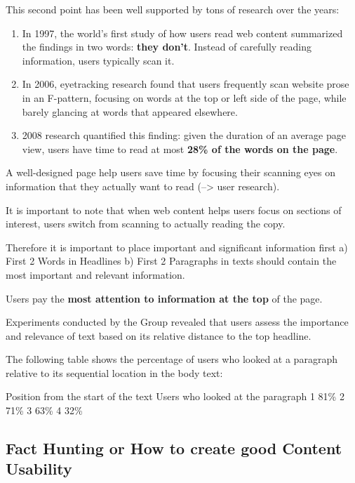 This second point has been well supported by tons of research over the years:
\begin{enumerate}
	\item In 1997, the world's first study of how users read web content summarized the findings in two words: \textbf{they don't}. Instead of carefully reading information, users typically scan it.
	\item In 2006, eyetracking research found that users frequently scan website prose in an F-pattern, focusing on words at the top or left side of the page, while barely glancing at words that appeared elsewhere.
	\item 2008 research quantified this finding: given the duration of an average page view, users have time to read at most \textbf{28\% of the words on the page}.
\end{enumerate}


A well-designed page help users save time by focusing their scanning eyes on information that they actually want to read (--> user research).

It is important to note that when web content helps users focus on sections of interest, users switch from scanning to actually reading the copy.

Therefore it is important to place important and significant information first
a) First 2 Words in Headlines
b) First 2 Paragraphs in texts should contain the most important and relevant information.

Users pay the \textbf{most attention to information at the top} of the page.

Experiments conducted by the Group revealed that users assess the importance and relevance of text based on its relative distance to the top headline. 

The following table shows the percentage of users who looked at a paragraph relative to its sequential location in the body text:

Position from the start of the text	Users who looked at the paragraph
1	81\%
2	71\%
3	63\%
4	32\%



\subsection{Fact Hunting or How to create good Content Usability} %
\label{sub:fact_hunting}


